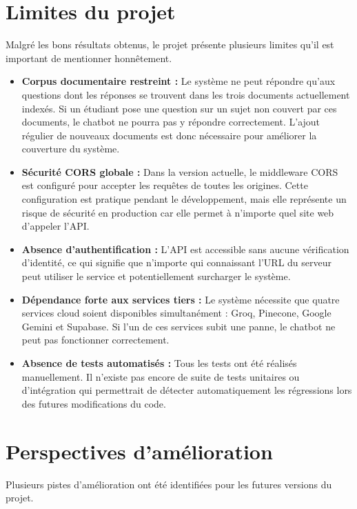 \documentclass[12pt, a4paper, twoside]{report}
\begin{document}
\section{Limites du projet}
Malgré les bons résultats obtenus, le projet présente plusieurs limites qu'il est important de mentionner honnêtement.

\begin{itemize}[label=\bullet]
    \item \textbf{Corpus documentaire restreint :} Le système ne peut répondre qu'aux questions dont les réponses se trouvent dans les trois documents actuellement indexés. Si un étudiant pose une question sur un sujet non couvert par ces documents, le chatbot ne pourra pas y répondre correctement. L'ajout régulier de nouveaux documents est donc nécessaire pour améliorer la couverture du système.
    \item \textbf{Sécurité CORS globale :} Dans la version actuelle, le middleware CORS est configuré pour accepter les requêtes de toutes les origines. Cette configuration est pratique pendant le développement, mais elle représente un risque de sécurité en production car elle permet à n'importe quel site web d'appeler l'API.
    \item \textbf{Absence d'authentification :} L'API est accessible sans aucune vérification d'identité, ce qui signifie que n'importe qui connaissant l'URL du serveur peut utiliser le service et potentiellement surcharger le système.
    \item \textbf{Dépendance forte aux services tiers :} Le système nécessite que quatre services cloud soient disponibles simultanément : Groq, Pinecone, Google Gemini et Supabase. Si l'un de ces services subit une panne, le chatbot ne peut pas fonctionner correctement.
    \item \textbf{Absence de tests automatisés :} Tous les tests ont été réalisés manuellement. Il n'existe pas encore de suite de tests unitaires ou d'intégration qui permettrait de détecter automatiquement les régressions lors des futures modifications du code.
\end{itemize}

\section{Perspectives d'amélioration}
Plusieurs pistes d'amélioration ont été identifiées pour les futures versions du projet.
\end{document}
